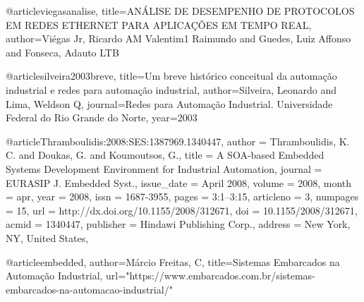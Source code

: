 @article{viegasanalise,
  title={AN{\'A}LISE DE DESEMPENHO DE PROTOCOLOS EM REDES ETHERNET PARA APLICA{\c{C}}{\~O}ES EM TEMPO REAL},
  author={Vi{\'e}gas Jr, Ricardo AM Valentim1 Raimundo and Guedes, Luiz Affonso and Fonseca, Adauto LTB}
}

@article{silveira2003breve,
  title={Um breve hist{\'o}rico conceitual da automa{\c{c}}{\~a}o industrial e redes para automa{\c{c}}{\~a}o industrial},
  author={Silveira, Leonardo and Lima, Weldson Q},
  journal={Redes para Automa{\c{c}}{\~a}o Industrial. Universidade Federal do Rio Grande do Norte},
  year={2003}
}

@article{Thramboulidis:2008:SES:1387969.1340447,
 author = {Thramboulidis, K. C. and Doukas, G. and Koumoutsos, G.},
 title = {A SOA-based Embedded Systems Development Environment for Industrial Automation},
 journal = {EURASIP J. Embedded Syst.},
 issue_date = {April 2008},
 volume = {2008},
 month = apr,
 year = {2008},
 issn = {1687-3955},
 pages = {3:1--3:15},
 articleno = {3},
 numpages = {15},
 url = {http://dx.doi.org/10.1155/2008/312671},
 doi = {10.1155/2008/312671},
 acmid = {1340447},
 publisher = {Hindawi Publishing Corp.},
 address = {New York, NY, United States},
} 

@article{embedded,
    author={Márcio Freitas, C},
    title={Sistemas Embarcados na Automa{\c{c}}{\~a}o Industrial},
    url={"https://www.embarcados.com.br/sistemas-embarcados-na-automacao-industrial/"}
}

